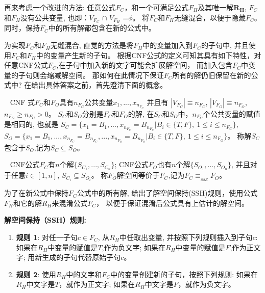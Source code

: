 再来考虑一个改进的方法:
任意公式$F_C$，和一个可满足公式$F_H$及其唯一解\textsl{${\textbf{R}}_{\textbf{H}}$},
$F_C$和$F_H$没有公共变量, 也即：$V_{F_C}$ $\cap$ $V_{F_H}$ =$\phi$。
将$F_C$和$F_H$无缝混合，以便于隐藏$F_C$。
同时，保持$F_C$中的所有解都包含在新的公式中。

为实现$F_C$和$F_H$无缝混合,
直觉的方法是将$F_H$中的变量加入到$F_C$的子句中,
并且使用$F_C$和$F_H$中的变量产生新的子句。
根据CNF公式的定义可知其具有如下特性，对任意CNF公式$F_C$,在子句中加入新的文字可能会扩展解空间，
而加入包含$F_C$中变量的子句则会缩减解空间。
那如何在此情况下保证$F_C$所有的解仍旧保留在新的公式中?
在给出具体答案之前，首先澄清下面的概念。

\begin{definition}~
CNF 式$F_C$和$F_O$具有$n_{F_C}$公共变量$x_1,...,x_{n_{F_C}}$ 并且有
$|V_{F_C}|\equiv n_{F_C}$, $|V_{F_O}|\equiv n_{F_O}$, $ n_{F_O}\geqslant n_{F_C} > 0$。
$S_C$和$S_O$分别是$F_C$和$F_O$的解,
在$S_C$和$S_O$中，$n_{F_C}$个公共变量的赋值是相同的, 也就是
$S_C=\{x_1=B_1,...,x_{n_{F_C}}=B_{n_{F_C}} | B_i \in \{T,F\},~1\leqslant i\leqslant n_{F_C} \}$,
$S_O=\{x_1=B_1,...,x_{n_{F_C}}=B_{n_{F_C}},...,x_{n_{F_O}}=B_{n_{F_O}}|B_i\in \{T,F\},~ 1\leqslant i\leqslant n_{F_O} \}$。
称解$S_C$包含于$S_O$,记为$S_C\subseteq S_O$。
\end{definition}

\begin{definition}\label{3:SSEdefinition}~
CNF公式$F_C$有$n$个解$\{S_{C_1},...,S_{C_n}\}$;
CNF公式$F_O$也有$n$个解$\{S_{O_1},...,S_{O_n}\}$,
并且对于任意$i \in [1,n]$, $S_{C_i} \subseteq S_{O_i}$。
称$F_O$解空间等价于$F_C$,记为$F_C \equiv_{_{SSE}} F_O$。
\end{definition}

为了在新公式中保持$F_C$公式中的所有解,
给出了解空间保持(SSH)规则，使用公式$F_H$和它的解$R_H$来混淆公式$F_C$，
以便于保证混淆后公式具有上估计的解空间。

\textbf{解空间保持（SSH）规则: }
\begin{enumerate}
\item \textbf{规则 1}:
对任一子句$c\in F_{C}$,
从$R_H$中任取出变量,
并按照下列规则插入到子句$c$:
如果在$R_H$中变量的赋值是$T$,作为负文字;
如果在$R_H$中变量的赋值是$F$,作为正文字;
用新生成的子句代替原始子句$c$。
\item \textbf{规则 2}:
使用$R_H$中的文字和$F_C$中的变量创建新的子句，按照下列规则:
如果在$R_H$中文字是$T$，就作为正文字;
如果在$R_H$中文字是$F$，就作为负文字。
\end{enumerate}


